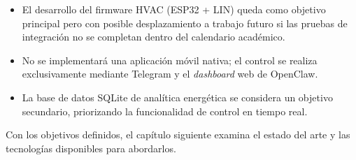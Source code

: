 \begin{itemize}
    \item El desarrollo del firmware HVAC (ESP32 + LIN) queda como objetivo principal pero con posible desplazamiento a trabajo futuro si las pruebas de integración no se completan dentro del calendario académico.
    \item No se implementará una aplicación móvil nativa; el control se realiza exclusivamente mediante Telegram y el \textit{dashboard} web de OpenClaw.
    \item La base de datos SQLite de analítica energética se considera un objetivo secundario, priorizando la funcionalidad de control en tiempo real.
\end{itemize}

Con los objetivos definidos, el capítulo siguiente examina el estado del arte y las tecnologías disponibles para abordarlos.
